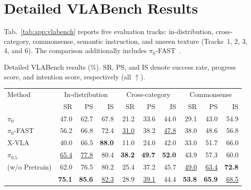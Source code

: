 \section{Detailed VLABench Results}
\label{app:vlabench}

Tab.~\ref{tab:app:vlabench} reports five evaluation tracks:
in-distribution, cross-category, commonsense, semantic instruction, and
unseen texture (Tracks~1, 2, 3, 4, and 6). The comparison additionally
includes $\pi_0$-FAST~\citep{pertsch2025fast}.

\begin{center}
\begin{minipage}{\linewidth}
\makeatletter{}\makeatother
    \centering
    \small
    \setlength{\tabcolsep}{4pt}
    \renewcommand{\arraystretch}{1.15}
    \caption{Detailed VLABench results (\%). SR, PS, and IS denote
    success rate, progress score, and intention score, respectively
    (all $\uparrow$).}
    \label{tab:app:vlabench}
    \vspace{3pt}
    \begin{adjustbox}{max width=\linewidth}
    \begin{tabular*}{0.94\linewidth}{@{\extracolsep{\fill}}l*{9}{r}@{}}
        \toprule
        Method & \multicolumn{3}{c}{In-distribution}
        & \multicolumn{3}{c}{Cross-category}
        & \multicolumn{3}{c}{Commonsense} \\
        \cmidrule(lr){2-4}\cmidrule(lr){5-7}\cmidrule(lr){8-10}
        & SR & PS & IS & SR & PS & IS & SR & PS & IS \\
        \midrule
        $\pi_0$ & 47.0 & 62.7 & 67.8 & 21.2 & 33.6 & 44.0 & 29.1 & 43.0 & 54.9 \\
        $\pi_0$-FAST & 56.2 & 66.8 & 72.4 & \underline{31.0} & 38.2 & \underline{47.8} & 38.0 & 48.6 & 56.8 \\
        X-VLA & 40.0 & 66.5 & \textbf{88.0} & 11.0 & 24.0 & 42.0 & 33.0 & 51.7 & 66.0 \\
        $\pi_{0.5}$ & \underline{65.4} & \underline{77.8} & 80.4 & \textbf{38.2} & \textbf{49.7} & \textbf{52.0} & 43.9 & 57.3 & 60.0 \\
        \midrule
        \method{} (w/o Pretrain) & 62.0 & 76.5 & 80.2 & 25.4 & 37.2 & 45.7 & \underline{49.0} & \underline{63.4} & \textbf{72.8} \\
        \method{} & \textbf{75.1} & \textbf{85.6} & \underline{82.3} & 28.9 & \underline{39.1} & 44.4 & \textbf{53.8} & \textbf{65.9} & \underline{68.5} \\
        \midrule

\end{tabular*}
\end{adjustbox}
\end{minipage}
\end{center}
